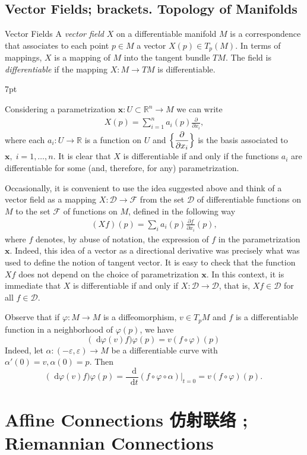 \documentclass[
	border={25mm 20mm 25mm 30mm},  %
	varwidth,  %
]{standalone}
\newcommand\dd{\mathop{}\!\mathrm{d}}%
\newenvironment{greenformal}{%
\def\FrameCommand{%
\hspace{1pt}%
{\color{greenframeshade}\vrule width 2pt}%
{\color{greenformalshade}\vrule width 4pt}%
\colorbox{greenformalshade}%
}%
\MakeFramed{\advance\hsize-\width\FrameRestore}%
\noindent\hspace{-4.55pt}%
\begin{adjustwidth}{}{7pt}%
\vspace{1pt}\vspace{1pt}%
}
{%
\vspace{5pt}\end{adjustwidth}\endMakeFramed%
}
\begin{document}
\subsection{Vector Fields; brackets. Topology of Manifolds}

\begin{tips}{Vector Fields}
    A \textsl{vector field} \(X\) on a differentiable manifold \(M\) is a correspondence that associates to each point \(p\in M\) a vector \(X(p)\in T_p(M)\). In terms of mappings, \(X\) is a mapping of \(M\) into the tangent bundle \(TM\). The field is \textsl{differentiable} if the mapping \(X:M\to TM\) is differentiable.
\end{tips}

\begin{greenformal}
    Considering a parametrization \(\mathbf{x}:U\subset\mathbb{R}^n\to M\) we can write
    \begin{align}
        X(p)=\sum_{i=1}^{n}{a_i(p)\frac{\partial}{\partial x_i}},
    \end{align}
    where each \(a_i:U\to\mathbb{R}\) is a function on \(U\) and \(\Bigl\{\dfrac{\partial}{\partial x_i}\Bigr\}\) is the basis associated to \(\mathbf{x},\; i=1,\dots,n\). It is clear that \(X\) is differentiable if and only if the functions \(a_i\) are differentiable for some (and, therefore, for any) parametrization.

    Occasionally, it is convenient to use the idea suggested above and think of a vector field as a mapping \(X:\mathcal{D}\to\mathcal{F}\) from the set \(\mathcal{D}\) of differentiable functions on \(M\) to the set \(\mathcal{F}\) of functions on \(M\), defined in the following way
    \begin{align}
        (Xf)(p)=\sum_i{a_i(p)\frac{\partial f}{\partial x_i}(p)},
    \end{align} 
    where \(f\) denotes, by abuse of notation, the expression of \(f\) in the parametrization \(\mathbf{x}\). Indeed, this idea of a vector as a directional derivative was precisely what was used to define the notion of tangent vector. It is easy to check that the function \(Xf\) does not depend on the choice of parametrization \(\mathbf{x}\). In this context, it is immediate that \(X\) is differentiable if and only if \(X:\mathcal{D}\to\mathcal{D}\), that is, \(Xf\in \mathcal{D}\) for all \(f\in\mathcal{D}\).

    Observe that if \(\varphi:M\to M\) is a diffeomorphism, \(v\in T_pM\) and \(f\) is a differentiable function in a neighborhood of \(\varphi(p)\), we have
    \[\bigl(\dd\varphi(v)f\bigr)\varphi(p)=v(f\circ\varphi)(p)\]
    Indeed, let \(\alpha:(-\varepsilon,\varepsilon)\to M\) be a differentiable curve with \(\alpha'(0)=v,\alpha(0)=p\). Then
    \[\bigl(\dd\varphi(v)f\bigr)\varphi(p)=\frac{\dd}{\dd t}(f\circ\varphi\circ\alpha)\Big|_{t=0}=v(f\circ\varphi)(p).\]

\end{greenformal}

\section{Affine Connections 仿射联络 ; Riemannian Connections}
\end{document}
